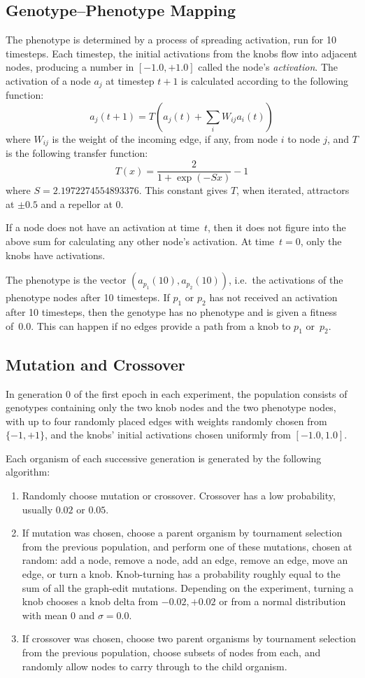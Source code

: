 \documentclass[letterpaper]{article}
\begin{document}
\subsection{Genotype--Phenotype Mapping}

The phenotype is determined by a process of spreading activation, run for
10 timesteps. Each timestep, the initial activations from the knobs flow into
adjacent nodes, producing a number in $[-1.0, +1.0]$ called the node's
\textit{activation}. The activation of a node $a_j$ at timestep $t+1$ is
calculated according to the following function:
\[
   a_j(t+1) = T(a_j(t) + \sum_iW_{ij}a_i(t))
\]
where $W_{ij}$ is the weight of the incoming edge, if any, from node $i$ to
node $j$, and $T$ is the following transfer function:
\[
   T(x) = \frac{2}{1+\exp(-Sx)}-1
\]
where $S=2.1972274554893376$. This constant gives $T$, when iterated,
attractors at $\pm0.5$ and a repellor at 0.

If a node does not have an activation at time~$t$, then it does not figure
into the above sum for calculating any other node's activation. At time~$t=0$,
only the knobs have activations.

The phenotype is the vector $(a_{p_1}(10), a_{p_2}(10))$, i.e.~the activations
of the phenotype nodes after 10 timesteps. If $p_1$ or $p_2$ has not received
an activation after 10 timesteps, then the genotype has no phenotype and is
given a fitness of~0.0. This can happen if no edges provide a path from a knob
to $p_1$ or~$p_2$.

\subsection{Mutation and Crossover}

In generation 0 of the first epoch in each experiment, the population consists
of genotypes containing only the two knob nodes and the two phenotype nodes,
with up to four randomly placed edges with weights randomly chosen from $\{-1,
+1\}$, and the knobs' initial activations chosen uniformly from $[-1.0, 1.0]$.

Each organism of each successive generation is generated by the following
algorithm:
\begin{enumerate}
  \item Randomly choose mutation or crossover. Crossover has a low probability,
    usually $0.02$ or $0.05$.
  \item If mutation was chosen, choose a parent organism by tournament selection
    from the previous population, and perform one of these mutations, chosen at
    random: add a node, remove a node, add an edge, remove an edge, move an
    edge, or turn a knob. Knob-turning has a probability roughly equal to the
    sum of all the graph-edit mutations. Depending on the experiment, turning a
    knob chooses a knob delta from ${-0.02, +0.02}$ or from a normal
    distribution with mean 0 and $\sigma = 0.0$.
  \item If crossover was chosen, choose two parent organisms by tournament
    selection from the previous population, choose subsets of nodes from each,
    and randomly allow nodes to carry through to the child organism.
\end{enumerate}
\end{document}
